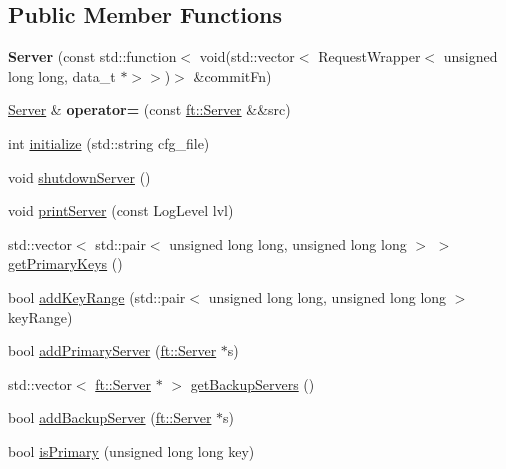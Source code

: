 \subsection*{Public Member Functions}
\begin{DoxyCompactItemize}
\item 
\mbox{\label{classft_1_1Server_a54c26146796a31505fe17da93478e858}} 
{\bfseries Server} (const std\+::function$<$ void(std\+::vector$<$ Request\+Wrapper$<$ unsigned long long, data\+\_\+t $\ast$$>$$>$)$>$ \&commit\+Fn)
\item 
\mbox{\label{classft_1_1Server_a63475cd47ee0ffbbbb323059f83cbd27}} 
\mbox{\hyperlink{classft_1_1Server}{Server}} \& {\bfseries operator=} (const \mbox{\hyperlink{classft_1_1Server}{ft\+::\+Server}} \&\&src)
\item 
int \mbox{\hyperlink{classft_1_1Server_a834002a833999b593d357b72ef69ddcf}{initialize}} (std\+::string cfg\+\_\+file)
\item 
void \mbox{\hyperlink{classft_1_1Server_a4df01ccbcc6295e4930e3c65dedaa595}{shutdown\+Server}} ()
\item 
void \mbox{\hyperlink{classft_1_1Server_a0c333cc78d88ff7ada32ffff429a8788}{print\+Server}} (const Log\+Level lvl)
\item 
std\+::vector$<$ std\+::pair$<$ unsigned long long, unsigned long long $>$ $>$ \mbox{\hyperlink{classft_1_1Server_a86cc643b14f616c8ba0ecaddbbb696eb}{get\+Primary\+Keys}} ()
\item 
bool \mbox{\hyperlink{classft_1_1Server_a5f5dd98bd5956bb480f4e8564c7620cd}{add\+Key\+Range}} (std\+::pair$<$ unsigned long long, unsigned long long $>$ key\+Range)
\item 
bool \mbox{\hyperlink{classft_1_1Server_a395dbe95b7c78b48213a62b4bc2d7c9d}{add\+Primary\+Server}} (\mbox{\hyperlink{classft_1_1Server}{ft\+::\+Server}} $\ast$s)
\item 
std\+::vector$<$ \mbox{\hyperlink{classft_1_1Server}{ft\+::\+Server}} $\ast$ $>$ \mbox{\hyperlink{classft_1_1Server_a97e94c9e9c8ed5eb8282564f1d2db739}{get\+Backup\+Servers}} ()
\item 
bool \mbox{\hyperlink{classft_1_1Server_a2458eef12718b2f04129a68ddea466c3}{add\+Backup\+Server}} (\mbox{\hyperlink{classft_1_1Server}{ft\+::\+Server}} $\ast$s)
\item 
bool \mbox{\hyperlink{classft_1_1Server_ac3c476b8dad7bbb3fb39470c79dc2a6e}{is\+Primary}} (unsigned long long key)

\end{DoxyCompactItemize}
